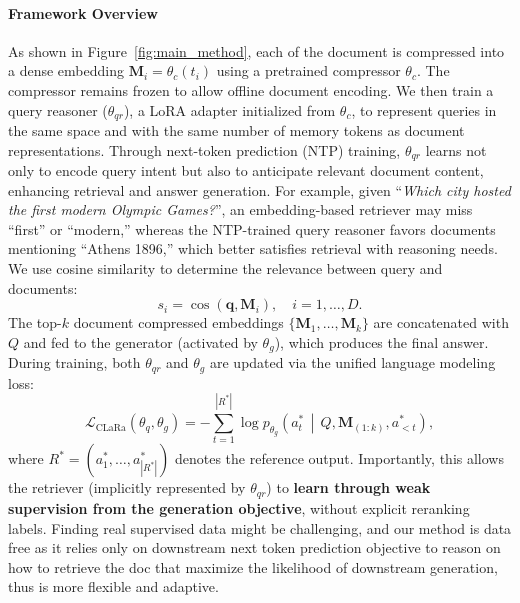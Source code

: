 \documentclass{applemlr}
\numberwithin{equation}{section}
\begin{document}
\paragraph{Framework Overview}
As shown in Figure~\ref{fig:main_method}, each of the document is compressed into a dense embedding $\mathbf{M}_i = \theta_c(t_i)$ using a pretrained compressor $\theta_c$. 
The compressor remains frozen to allow offline document encoding.
We then train a query reasoner ($\theta_{qr}$), a LoRA adapter initialized from $\theta_c$, to represent queries in the same space and with the same number of memory tokens as document representations.
Through next-token prediction (NTP) training, $\theta_{qr}$ learns not only to encode query intent but also to anticipate relevant document content, enhancing retrieval and answer generation.
For example, given ``\textit{Which city hosted the first modern Olympic Games?}'', an embedding-based retriever may miss ``first'' or ``modern,'' whereas the NTP-trained query reasoner favors documents mentioning ``Athens 1896,''  which better satisfies retrieval with reasoning needs.
We use cosine similarity to determine the relevance between query and documents:
\begin{equation}
s_i = \cos(\mathbf{q}, \mathbf{M}_i), \quad i = 1, \dots, D.
\label{eq_simi}
\end{equation}
The top-$k$ document compressed embeddings $\{\mathbf{M}_{1}, \dots, \mathbf{M}_{k}\}$ are concatenated with $Q$ and fed to the generator (activated by $\theta_g$), which produces the final answer.
During training, both $\theta_{qr}$ and $\theta_g$ are updated via the unified language modeling loss:
\begin{equation}
\mathcal{L}_{\text{CLaRa}}(\theta_q, \theta_g)
= - \sum_{t=1}^{|R^*|} 
\log p_{\theta_g}\!\left(a_t^* \,\middle|\, Q, 
\mathbf{M}_{(1:k)}, 
a_{<t}^*\right),
\end{equation}
where $R^* = (a_1^*, \dots, a_{|R^*|}^*)$ denotes the reference output. 
Importantly, this allows the retriever (implicitly represented by $\theta_{qr}$) to \textbf{learn through weak supervision from the generation objective}, without explicit reranking labels. Finding real supervised data might be challenging, and our method is data free as it relies only on downstream next token prediction objective to reason on how to retrieve the doc that maximize the likelihood of downstream generation, thus is more flexible and  adaptive.
\end{document}
